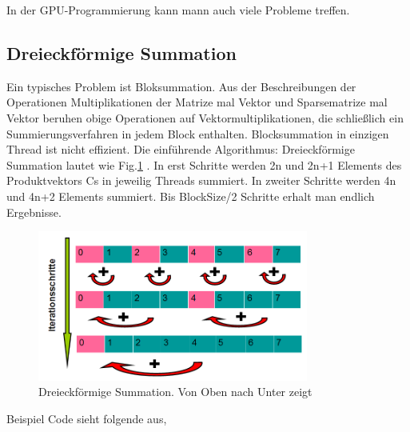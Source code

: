 
In der GPU-Programmierung kann mann auch viele Probleme treffen.

\subsection{Dreieckförmige Summation}
Ein typisches Problem ist Bloksummation. Aus der Beschreibungen der Operationen Multiplikationen der Matrize mal Vektor und Sparsematrize  mal Vektor beruhen obige Operationen auf Vektormultiplikationen, die schließlich ein Summierungsverfahren in jedem Block enthalten. Blocksummation in einzigen Thread ist nicht effizient. Die einführende Algorithmus: Dreieckförmige Summation lautet wie Fig.\ref{Dreieck} . In erst Schritte werden 2n und 2n+1 Elements des Produktvektors Cs in jeweilig Threads summiert. In zweiter Schritte werden 4n und 4n+2 Elements summiert. Bis BlockSize/2 Schritte erhalt man endlich Ergebnisse.

\begin{figure}[htbp]
\includegraphics[width=3.5in]{../xby/pic//dreieck}
\caption{\label{Dreieck}Dreieckförmige Summation. Von Oben nach Unter zeigt}
\end{figure}

Beispiel Code sieht folgende aus,


